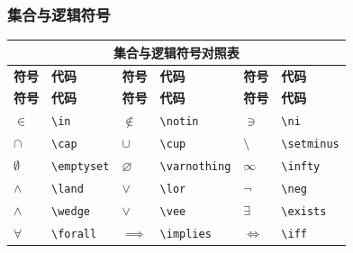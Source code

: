 \documentclass{article}
\begin{document}
\subsubsection{集合与逻辑符号}
\begin{longtable}{|p{1.5cm}|p{2cm}|p{1.5cm}|p{2cm}|p{1.5cm}|p{2cm}|}
    \hline
    \multicolumn{6}{|c|}{\textbf{集合与逻辑符号对照表}}                                                            \\
    \hline
    \textbf{符号} & \textbf{代码}      & \textbf{符号}   & \textbf{代码}        & \textbf{符号} & \textbf{代码}      \\
    \hline
    \endfirsthead
    \hline
    \textbf{符号} & \textbf{代码}      & \textbf{符号}   & \textbf{代码}        & \textbf{符号} & \textbf{代码}      \\
    \hline
    \endhead
    $\in$       & \verb|\in|       & $\notin$      & \verb|\notin|      & $\ni$       & \verb|\ni|       \\
    $\cap$      & \verb|\cap|      & $\cup$        & \verb|\cup|        & $\setminus$ & \verb|\setminus| \\
    $\emptyset$ & \verb|\emptyset| & $\varnothing$ & \verb|\varnothing| & $\infty$    & \verb|\infty|    \\
    $\land$     & \verb|\land|     & $\lor$        & \verb|\lor|        & $\neg$      & \verb|\neg|      \\
    $\wedge$    & \verb|\wedge|    & $\vee$        & \verb|\vee|        & $\exists$   & \verb|\exists|   \\
    $\forall$   & \verb|\forall|   & $\implies$    & \verb|\implies|    & $\iff$      & \verb|\iff|      \\
    \hline
\end{longtable}
\end{document}
